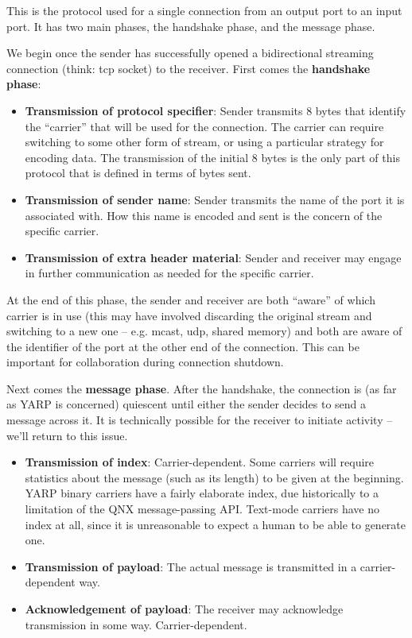This is the protocol used for a single connection from an output port
to an input port. It has two main phases, the handshake phase,
and the message phase.

We begin once the sender has successfully opened a bidirectional
streaming connection (think: tcp socket) to the receiver.
First comes the {\bf handshake phase}:

\begin{itemize} \pflist

\item {\bf Transmission of protocol specifier}:
Sender transmits 8 bytes that identify the ``carrier'' that will be
used for the connection.  The carrier can require switching to 
some other form of stream, or using a particular strategy for
encoding data.  The transmission of the initial 8 bytes is the
only part of this protocol that is defined in terms of bytes sent.

\item {\bf Transmission of sender name}: Sender transmits the name of
the port it is associated with.  How this name is encoded and sent is
the concern of the specific carrier.

\item {\bf Transmission of extra header material}: Sender and
receiver may engage in further communication as needed for the
specific carrier.  

\end{itemize}

At the end of this phase, the sender and receiver are both ``aware''
of which carrier is in use (this may have involved discarding the
original stream and switching to a new one -- e.g. mcast, udp, shared
memory) and both are aware of the identifier of the port at the
other end of the connection.  This can be important for collaboration
during connection shutdown.


Next comes the {\bf message phase}.
After the handshake, the connection is (as far as YARP is concerned)
quiescent until either the sender decides to send a message across it.
It is technically possible for the receiver to initiate activity --
we'll return to this issue.

\begin{itemize} \pflist

\item {\bf Transmission of index}: Carrier-dependent. Some carriers
will require statistics about the message (such as its length) to be
given at the beginning.  YARP binary carriers have a fairly elaborate
index, due historically to a limitation of the QNX message-passing
API.  Text-mode carriers have no index at all, since it is
unreasonable to expect a human to be able to generate one.

\item {\bf Transmission of payload}: The actual message is
transmitted in a carrier-dependent way.

\item {\bf Acknowledgement of payload}: The receiver may 
acknowledge transmission in some way.  Carrier-dependent.

\end{itemize}

